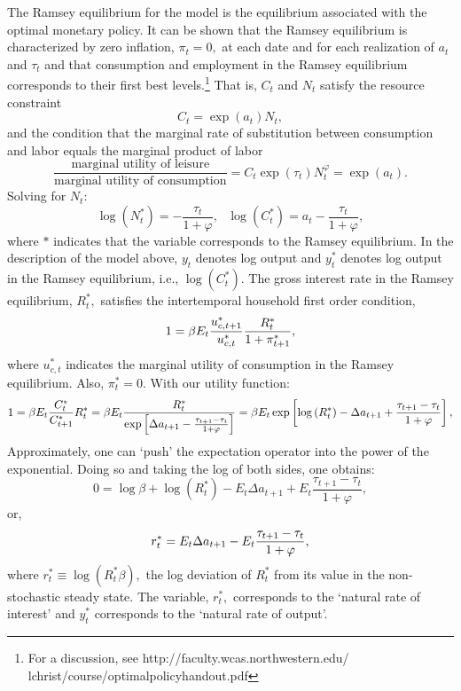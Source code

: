 The Ramsey equilibrium for the model is the equilibrium associated with the
optimal monetary policy. It can be shown that the Ramsey equilibrium is
characterized by zero inflation, $\pi _{t}=0,$ at each date and for each
realization of $a_{t}$ and $\tau _{t}$ and that consumption and employment
in the Ramsey equilibrium corresponds to their first best levels.\footnote{%
For a discussion, see http://faculty.wcas.northwestern.edu/%
lchrist/course/optimalpolicyhandout.pdf} That is, $C_{t}$ and $N_{t}$
satisfy the resource constraint%
\[
C_{t}=\exp \left( a_{t}\right) N_{t}, 
\]
and the condition that the marginal rate of substitution between consumption
and labor equals the marginal product of labor%
\[
\frac{\text{marginal utility of leisure}}{\text{marginal utility of
consumption}}=C_{t}\exp \left( \tau _{t}\right) N_{t}^{\varphi }=\exp \left(
a_{t}\right) . 
\]%
Solving for $N_{t}:$%
\[
\log \left( N_{t}^{\ast }\right) =-\frac{\tau _{t}}{1+\varphi },\text{ }\log
\left( C_{t}^{\ast }\right) =a_{t}-\frac{\tau _{t}}{1+\varphi }, 
\]%
where $\ast $ indicates that the variable corresponds to the Ramsey
equilibrium. In the description of the model above, $y_{t}$ denotes log
output and $y_{t}^{\ast }$ denotes log output in the Ramsey equilibrium,
i.e., $\log \left( C_{t}^{\ast }\right) .$ The gross interest rate in the
Ramsey equilibrium, $R_{t}^{\ast },$ satisfies the intertemporal household
first order condition, 
\[
1=\beta E_{t}\frac{u_{c,t+1}^{\ast }}{u_{c,t}^{\ast }}\frac{R_{t}^{\ast }}{%
1+\pi _{t+1}^{\ast }}, 
\]%
where $u_{c,t}^{\ast }$ indicates the marginal utility of consumption in the
Ramsey equilibrium. Also, $\pi _{t}^{\ast }=0.$ With our utility function:%
\[
1=\beta E_{t}\frac{C_{t}^{\ast }}{C_{t+1}^{\ast }}R_{t}^{\ast }=\beta E_{t}%
\frac{R_{t}^{\ast }}{\exp \left[ \Delta a_{t+1}-\frac{\tau _{t+1}-\tau _{t}}{%
1+\varphi }\right] }=\beta E_{t}\exp \left[ \log \left( R_{t}^{\ast }\right)
-\Delta a_{t+1}+\frac{\tau _{t+1}-\tau _{t}}{1+\varphi }\right] , 
\]%
Approximately, one can `push' the expectation operator into the power of the
exponential. Doing so and taking the log of both sides, one obtains:%
\[
0=\log \beta +\log \left( R_{t}^{\ast }\right) -E_{t}\Delta a_{t+1}+E_{t}%
\frac{\tau _{t+1}-\tau _{t}}{1+\varphi }, 
\]%
or,%
\[
r_{t}^{\ast }=E_{t}\Delta a_{t+1}-E_{t}\frac{\tau _{t+1}-\tau _{t}}{%
1+\varphi }, 
\]%
where $r_{t}^{\ast }\equiv \log \left( R_{t}^{\ast }\beta \right) ,$ the log
deviation of $R_{t}^{\ast }$ from its value in the non-stochastic steady
state. The variable, $r_{t}^{\ast },$ corresponds to the `natural rate of
interest' and $y_{t}^{\ast }$ corresponds to the `natural rate of output'.


